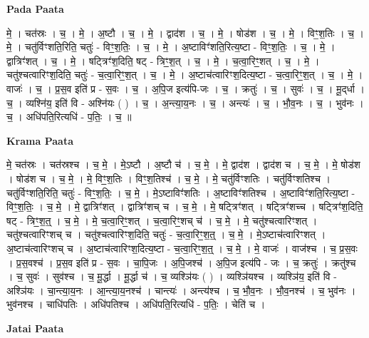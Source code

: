 \documentclass[17pt]{extarticle}
\begin{document}
\textbf{Pada Paata} \newline

मे॒ । चत॑स्रः । च॒ । मे॒ । अ॒ष्टौ । च॒ । मे॒ । द्वाद॑श । च॒ । मे॒ । षोड॑श । च॒ । मे॒ । विꣳ॒श॒तिः । च॒ । मे॒ । चतु॑र्विꣳशति॒रिति॒ चतुः॑ - विꣳ॒॒श॒तिः॒ । च॒ । मे॒ । अ॒ष्टाविꣳ॑शति॒रित्य॒ष्टा - विꣳ॒॒श॒तिः॒ । च॒ । मे॒ । द्वात्रिꣳ॑शत् । च॒ । मे॒ । षट्त्रिꣳ॑श॒दिति॒ षट् - त्रिꣳ॒॒श॒त् । च॒ । मे॒ । च॒त्वा॒रिꣳ॒॒शत् । च॒ । मे॒ । चतु॑श्चत्वारिꣳश॒दिति॒ चतुः॑ - च॒त्वा॒रिꣳ॒॒श॒त् । च॒ । मे॒ । अ॒ष्टाच॑त्वारिꣳश॒दित्य॒ष्टा - च॒त्वा॒रिꣳ॒॒श॒त् । च॒ । मे॒ । वाजः॑ । च॒ । प्र॒स॒व इति॑ प्र - स॒वः । च॒ । अ॒पि॒ज इत्य॑पि-जः । च॒ । क्रतुः॑ । च॒ । सुवः॑ । च॒ । मू॒द्‌र्धा । च॒ । व्यश्नि॑य॒ इति॑ वि - अश्नि॑यः ( ) । च॒ । अ॒न्त्या॒य॒नः । च॒ । अन्त्यः॑ । च॒ । भौ॒व॒नः । च॒ । भुव॑नः । च॒ । अधि॑पति॒रित्यधि॑ - प॒तिः॒ । च॒ ॥  \newline


\textbf{Krama Paata} \newline

मे॒ चत॑स्रः । चत॑स्रश्च । च॒ मे॒ । मे॒ऽष्टौ । अ॒ष्टौ च॑ । च॒ मे॒ । मे॒ द्वाद॑श । द्वाद॑श च । च॒ मे॒ । मे॒ षोड॑श । षोड॑श च । च॒ मे॒ । मे॒ विꣳ॒॒श॒तिः । विꣳ॒॒श॒तिश्च॑ । च॒ मे॒ । मे॒ चतु॑र्विꣳशतिः । चतु॑र्विꣳशतिश्च । चतु॑र्विꣳशति॒रिति॒ चतुः॑ - विꣳ॒॒श॒तिः॒ । च॒ मे॒ । मे॒ऽष्टाविꣳ॑शतिः । अ॒ष्टाविꣳ॑शतिश्च । अ॒ष्टाविꣳ॑शति॒रित्य॒ष्टा - विꣳ॒॒श॒तिः॒ । च॒ मे॒ । मे॒ द्वात्रिꣳ॑शत् । द्वात्रिꣳ॑शच् च । च॒ मे॒ । मे॒ षट्त्रिꣳ॑शत् । षट्त्रिꣳ॑शच्च । षट्त्रिꣳ॑श॒दिति॒ षट् - त्रिꣳ॒॒श॒त्॒ । च॒ मे॒ । मे॒ च॒त्वा॒रिꣳ॒॒शत् । च॒त्वा॒रिꣳ॒॒शच् च॑ । च॒ मे॒ । मे॒ चतु॑श्चत्वारिꣳशत् । चतु॑श्चत्वारिꣳशच् च । चतु॑श्चत्वारिꣳश॒दिति॒ चतुः॑ - च॒त्वा॒रिꣳ॒॒श॒त्॒ । च॒ मे॒ । मे॒ऽष्टाच॑त्वारिꣳशत् । अ॒ष्टाच॑त्वारिꣳशच् च । अ॒ष्टाच॑त्वारिꣳश॒दित्य॒ष्टा - च॒त्वा॒रिꣳ॒॒श॒त्॒ । च॒ मे॒ । मे॒ वाजः॑ । वाज॑श्च । च॒ प्र॒स॒वः । प्र॒स॒वश्च॑ । प्र॒स॒व इति॑ प्र - स॒वः । चा॒पि॒जः । अ॒पि॒जश्च॑ । अ॒पि॒ज इत्य॑पि - जः । च॒ क्रतुः॑ । क्रतु॑श्च । च॒ सुवः॑ । सुव॑श्च । च॒ मू॒र्द्धा । मू॒र्द्धा च॑ । च॒ व्यश्ञि॑यः ( ) । व्यश्ञि॑यश्च । व्यश्ञि॑य॒ इति॑ वि - अश्ञि॑यः । चा॒न्त्या॒य॒नः । आ॒न्त्या॒य॒नश्च॑ । चान्त्यः॑ । अन्त्य॑श्च । च॒ भौ॒व॒नः । भौ॒व॒नश्च॑ । च॒ भुव॑नः । भुव॑नश्च । चाधि॑पतिः । अधि॑पतिश्च । अधि॑पति॒रित्यधि॑ - प॒तिः॒ । चेति॑ च । \newline

\textbf{Jatai Paata} \newline
\end{document}
